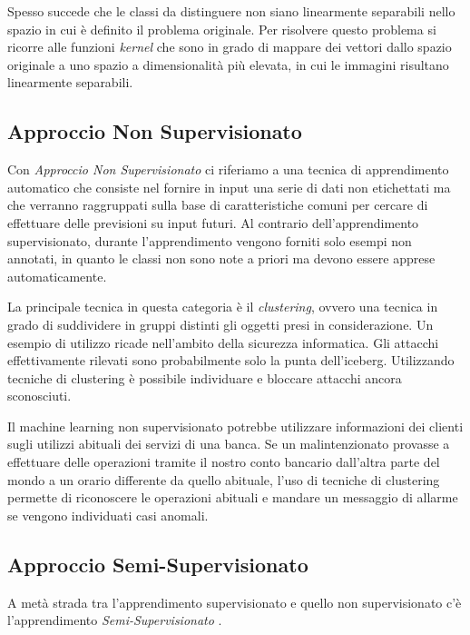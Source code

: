 \documentclass[a4paper,12pt]{report}
\begin{document}
Spesso succede che le classi da distinguere non siano linearmente separabili nello spazio in cui è definito il problema originale. Per risolvere questo problema si ricorre alle funzioni \textit{kernel} che sono in grado di mappare dei vettori dallo spazio originale a uno spazio a dimensionalità più elevata, in cui le immagini risultano linearmente separabili.

\subsection*{Approccio Non Supervisionato}
Con \textit{Approccio Non Supervisionato} \cite{unsupervised_learning} ci riferiamo a una tecnica di apprendimento automatico che consiste nel fornire in input una serie di dati non etichettati ma che verranno raggruppati sulla base di caratteristiche comuni  per cercare di effettuare delle previsioni su input futuri.
Al contrario dell'apprendimento supervisionato, durante l'apprendimento vengono forniti solo esempi non annotati, in quanto le classi non sono note a priori ma devono essere apprese automaticamente.

\bigskip

La principale tecnica in questa categoria è il \textit{clustering}, ovvero una tecnica in grado di suddividere in gruppi distinti  gli oggetti presi in considerazione.
Un esempio di utilizzo ricade nell'ambito della sicurezza informatica. Gli attacchi effettivamente rilevati sono probabilmente solo la punta dell'iceberg. Utilizzando tecniche di clustering è possibile individuare e bloccare attacchi ancora sconosciuti.

Il machine learning non supervisionato potrebbe utilizzare informazioni dei clienti sugli utilizzi abituali dei servizi di una banca. Se un malintenzionato provasse a effettuare delle operazioni tramite il nostro conto bancario dall'altra parte del mondo a un orario differente da quello abituale, l'uso di tecniche di clustering permette di riconoscere le operazioni abituali e mandare un messaggio di allarme se vengono individuati casi anomali.

\subsection*{Approccio Semi-Supervisionato}
A metà strada tra l'apprendimento supervisionato e quello non supervisionato c'è l'apprendimento \textit{Semi-Supervisionato} \cite{supervisedlearning}.
\end{document}
